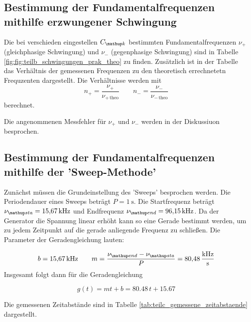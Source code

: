 \subsection{Bestimmung der Fundamentalfrequenzen mithilfe erzwungener Schwingung}
Die bei verschieden eingestellen $C\ua{k}$ bestimmten Fundamentalfrequenzen 
$\nu_+$ (gleichphasige Schwingung) und $\nu_-$ (gegenphasige Schwingung)
sind in Tabelle \ref{fig:fig:teilb_schwingungen_prak_theo} zu finden.
Zusätzlich ist in der Tabelle das Verhältnis der gemessenen Frequenzen 
zu den theoretisch errechnetetn Frequzenten dargestellt.
Die Verhältnisse werden mit
\begin{equation}
\label{eq:verh}
n_+=\frac{\nu_+}{\nu_{+\,\mathup{theo}}} \qquad n_-=\frac{\nu_-}{\nu_{-\,\mathup{theo}}}
\end{equation}
berechnet.
\FloatBarrier

\FloatBarrier
Die angenommenen Messfehler für $\nu_+$ und $\nu_-$ werden in der Diskussiuon besprochen.

\subsection{Bestimmung der Fundamentalfrequenzen mithilfe der 'Sweep-Methode'}
Zunächst müssen die Grundeinstellung des 'Sweeps' besprochen werden.
Die Periodendauer eines Sweeps beträgt $P=\SI{1}{\second}$.
Die Startfrequenz beträgt $\nu\ua{sta}=\SI{15.67}{\kilo\hertz}$ und 
Endfrequenz $\nu\ua{end}=\SI{96.15}{\kilo\hertz}$.
Da der Generator die Spannung linear erhöht kann so eine Gerade bestimmt werden, um 
zu jedem Zeitpunkt auf die gerade anliegende Frequenz zu schließen.
Die Parameter der Geradengleichung lauten:

\begin{equation*}
b=\SI{15.67}{\kilo\hertz} \qquad m=\frac{\nu\ua{end}-\nu\ua{sta}}{P}=\SI{80.48}{\kilo\hertz\per\second}
\end{equation*}
Insgesamt folgt dann für die Geradengleichung

\begin{equation}
\label{eq:geraden}
g(t)=mt+b=80.48\,t+15.67
\end{equation}

Die gemessenen Zeitabstände sind in Tabelle \ref{tab:teilc_gemessene_zeitabstaende} dargestellt.



